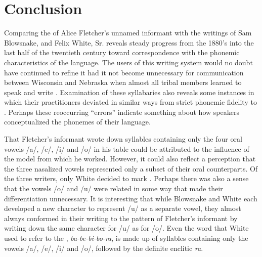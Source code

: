 \documentclass[output=paper]{LSP/langsci}
\begin{document}
\section{Conclusion}

Comparing the   of Alice Fletcher's unnamed informant with the writings of Sam Blowsnake, and Felix White, Sr. reveals steady progress from the 1880's into the last half of the twentieth century toward correspondence with the phonemic characteristics of the  language. The users of this writing system would no doubt have continued to refine it had it not become unnecessary for communication between Wisconsin and Nebraska when almost all tribal members learned to speak and write . Examination of these syllabaries also reveals some instances in which their practitioners deviated in similar ways from strict phonemic fidelity to . Perhaps these reoccurring ``errors'' indicate something about how  speakers conceptualized the phonemes of their language. 

That Fletcher's informant wrote down syllables containing only the four oral vowels /a/, /e/, /i/ and /o/ in his table could be attributed to the influence of the  model from which he worked. However, it could also reflect a perception that the three nasalized  vowels represented only a subset of their oral counterparts. Of the three  writers, only White decided to mark . Perhaps there was also a sense that the vowels /o/ and /u/ were related in some way that made their differentiation unnecessary. It is interesting that while Blowsnake and White each developed a new character to represent /u/ as a separate vowel, they almost always conformed in their writing to the pattern of Fletcher's informant by writing down the same character for /u/ as for /o/. Even the word that White used to refer to the , \emph{ba-be-bi-bo-ra}, is made up of syllables containing only the vowels /a/, /e/, /i/ and /o/, followed by the definite enclitic \emph{ra}. 
\end{document}
